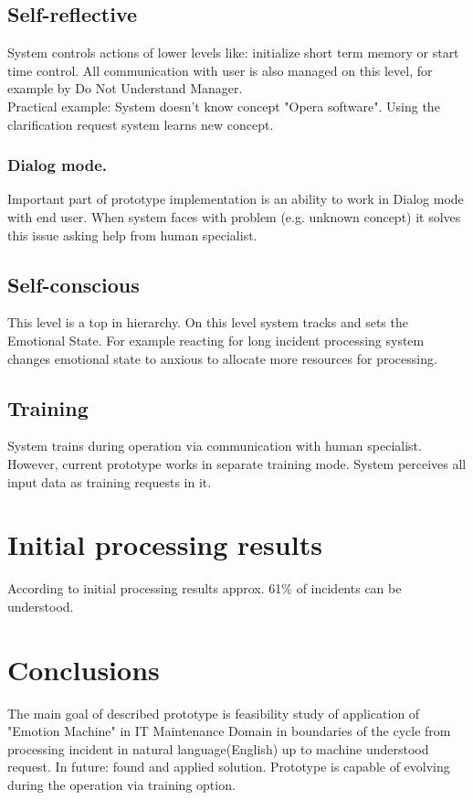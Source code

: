\documentclass[runningheads,a4paper]{llncs}
\begin{document}
\begin{enumerate}
\subsection{Self-reflective}
System controls actions of lower levels like: initialize short term memory or start time control. All communication with user is also managed on this level, for example by Do Not Understand Manager.\\
Practical example: System doesn't know concept "Opera software". Using the clarification request system learns new concept.

\subsubsection{Dialog mode.}
Important part of prototype implementation is an ability to work in Dialog mode with end user. When system faces with problem (e.g. unknown concept) it solves this issue asking help from human specialist.

\subsection{Self-conscious}
This level is a top in hierarchy. On this level system tracks and sets the Emotional State. For example reacting for long incident processing system changes emotional state to anxious to allocate more resources for processing.

\subsection{Training}
System trains during operation via communication with human specialist. However, current prototype works in separate training mode. System perceives all input data as training requests in it.

\section{Initial processing results}

According to initial processing results approx. 61\% of incidents can be understood.

\section{Conclusions}

The main goal of described prototype is feasibility study of application of "Emotion Machine" \cite{minsk} in IT Maintenance Domain in boundaries of the cycle from processing incident in natural language(English) up to machine understood request. In future: found and applied solution. Prototype is capable of evolving during the operation via training option.


\end{enumerate}
\end{document}
